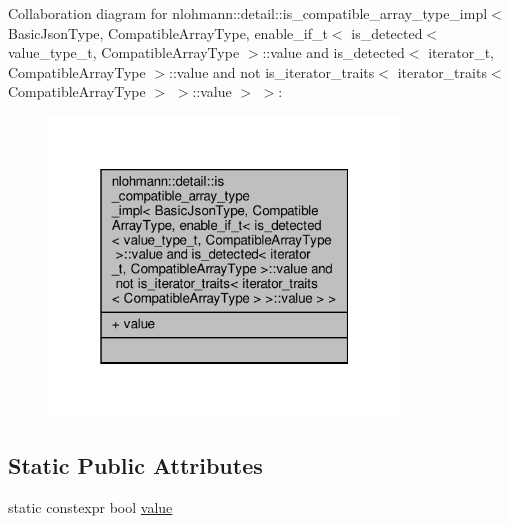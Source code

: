 Collaboration diagram for nlohmann\+:\+:detail\+:\+:is\+\_\+compatible\+\_\+array\+\_\+type\+\_\+impl$<$ Basic\+Json\+Type, Compatible\+Array\+Type, enable\+\_\+if\+\_\+t$<$ is\+\_\+detected$<$ value\+\_\+type\+\_\+t, Compatible\+Array\+Type $>$\+:\+:value and is\+\_\+detected$<$ iterator\+\_\+t, Compatible\+Array\+Type $>$\+:\+:value and not is\+\_\+iterator\+\_\+traits$<$ iterator\+\_\+traits$<$ Compatible\+Array\+Type $>$ $>$\+:\+:value $>$ $>$\+:\nopagebreak
\begin{figure}[H]
\begin{center}
\leavevmode
\includegraphics[width=265pt]{structnlohmann_1_1detail_1_1is__compatible__array__type__impl_3_01_basic_json_type_00_01_compati33ef64b66116fdd9e0b269acf78f6760}
\end{center}
\end{figure}
\subsection*{Static Public Attributes}
\begin{DoxyCompactItemize}
\item 
static constexpr bool \hyperlink{structnlohmann_1_1detail_1_1is__compatible__array__type__impl_3_01_basic_json_type_00_01_compati04c4671a9fa75002365be1949a74f972_aa9bdf31f85ac3ee17180a008f1cb81f7}{value}
\end{DoxyCompactItemize}


